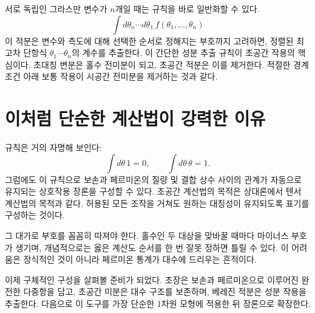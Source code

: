 서로 독립인 그라스만 변수가 \(n\)개일 때는 규칙을 바로 일반화할 수 있다.
\begin{equation}
\int d\theta_n\cdots d\theta_1\,
f(\theta_1,\ldots,\theta_n)
\end{equation}
이 적분은 변수와 측도에 대해 선택한 순서로 정해지는 부호까지 고려하면, 정렬된 최고차 단항식 \(\theta_1\cdots\theta_n\)의 계수를 추출한다. 이 간단한 성분 추출 규칙이 초공간 작용의 핵심이다. 초대칭 변분은 홀수 전미분이 되고, 초공간 적분은 이를 제거한다. 적절한 경계 조건 아래 보통 작용이 시공간 전미분을 제거하는 것과 같다.

\section{이처럼 단순한 계산법이 강력한 이유}

규칙은 거의 자명해 보인다:
\begin{equation}
\int d\theta\,1=0,
\qquad
\int d\theta\,\theta=1.
\end{equation}
그럼에도 이 규칙으로 보손과 페르미온의 질량 및 결합 상수 사이의 관계가 자동으로 유지되는 상호작용 장론을 구성할 수 있다. 초공간 계산법의 목적은 상대론에서 텐서 계산법의 목적과 같다. 허용된 모든 조작을 거쳐도 원하는 대칭성이 유지되도록 표기를 구성하는 것이다.

그 대가로 부호를 꼼꼼히 따져야 한다. 홀수인 두 대상을 맞바꿀 때마다 마이너스 부호가 생기며, 개념적으로는 옳은 계산도 순서를 한 번 잘못 정하면 틀릴 수 있다. 이 어려움은 장식적인 것이 아니라 페르미온 통계가 대수에 드리우는 흔적이다.

\begin{classroomqa}\end{classroomqa}

이제 구체적인 구성을 살펴볼 준비가 되었다. 초장은 보손과 페르미온으로 이루어진 완전한 다중항을 담고, 초공간 미분은 대수 구조를 보존하며, 베레진 적분은 성분 작용을 추출한다. 다음으로 이 도구를 가장 단순한 1차원 모형에 적용한 뒤 장론으로 확장한다.
